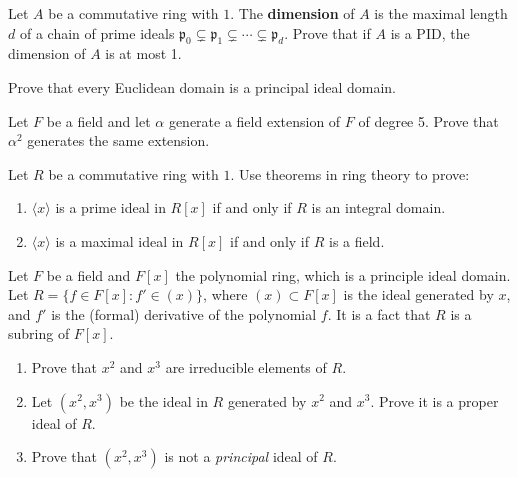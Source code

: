 \documentclass[11pt,twoside,openany]{memoir}
\begin{document}
    \begin{exercise}
    Let $A$ be a commutative ring with $1$. The \textbf{dimension} of $A$ is the maximal length $d$ of a chain of prime ideals $\mathfrak{p}_0\subsetneq \mathfrak{p}_1\subsetneq \cdots \subsetneq \mathfrak{p}_d$. Prove that if $A$ is a PID, the dimension of $A$ is at most 1.
    \end{exercise}
    
    \begin{exercise}
    Prove that every Euclidean domain is a principal ideal domain.
    \end{exercise}
    
    \begin{exercise}
    Let $F$ be a field and let $\alpha$ generate a field extension of $F$ of degree 5. Prove that $\alpha^2$ generates the same extension.
    \end{exercise}
    
    \begin{exercise}
    Let $R$ be a commutative ring with $1$. Use theorems in ring theory to prove:
    \begin{enumerate}[label = (\arabic*)]
        \item $\langle x\rangle$ is a prime ideal in $R[x]$ if and only if $R$ is an integral domain.
        \item $\langle x\rangle$ is a maximal ideal in $R[x]$ if and only if $R$ is a field.
    \end{enumerate}
    \end{exercise}
    
    \begin{exercise}
    Let $F$ be a field and $F[x]$ the polynomial ring, which is a principle ideal domain. Let $R=\{f\in F[x]: f'\in (x)\}$, where $(x)\subset F[x]$ is the ideal generated by $x$, and $f'$ is the (formal) derivative of the polynomial $f$. It is a fact that $R$ is a subring of $F[x]$.
    \begin{enumerate}[label = (\arabic*)]
        \item Prove that $x^2$ and $x^3$ are irreducible elements of $R$.
        \item Let $(x^2,x^3)$ be the ideal in $R$ generated by $x^2$ and $x^3$. Prove it is a proper ideal of $R$.
        \item Prove that $(x^2,x^3)$ is not a \textit{principal} ideal of $R$.
    \end{enumerate}
    \end{exercise}
    
\end{document}
